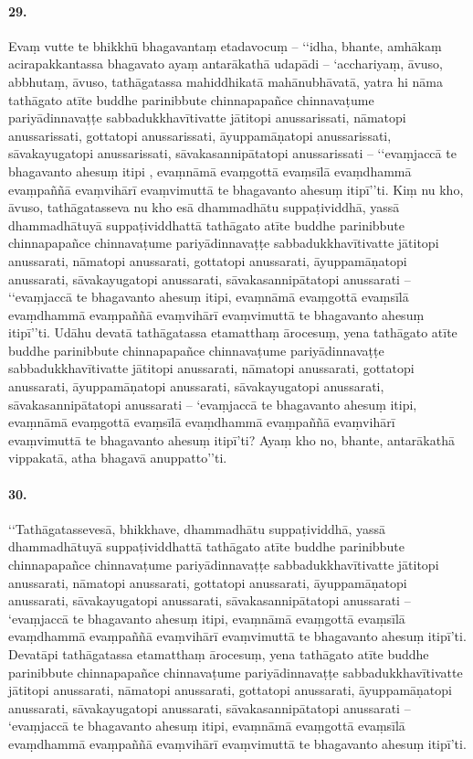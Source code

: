 \paragraph{29.} Evaṃ vutte te bhikkhū bhagavantaṃ etadavocuṃ – ‘‘idha, bhante, amhākaṃ acirapakkantassa bhagavato ayaṃ antarākathā udapādi – ‘acchariyaṃ, āvuso, abbhutaṃ, āvuso, tathāgatassa mahiddhikatā mahānubhāvatā, yatra hi nāma tathāgato atīte buddhe parinibbute chinnapapañce chinnavaṭume pariyādinnavaṭṭe sabbadukkhavītivatte jātitopi anussarissati, nāmatopi anussarissati, gottatopi anussarissati, āyuppamāṇatopi anussarissati, sāvakayugatopi anussarissati, sāvakasannipātatopi anussarissati – ‘‘evaṃjaccā te bhagavanto ahesuṃ itipi , evaṃnāmā evaṃgottā evaṃsīlā evaṃdhammā evaṃpaññā evaṃvihārī evaṃvimuttā te bhagavanto ahesuṃ itipī’’ti. Kiṃ nu kho, āvuso, tathāgatasseva nu kho esā dhammadhātu suppaṭividdhā, yassā dhammadhātuyā suppaṭividdhattā tathāgato atīte buddhe parinibbute chinnapapañce chinnavaṭume pariyādinnavaṭṭe sabbadukkhavītivatte jātitopi anussarati, nāmatopi anussarati, gottatopi anussarati, āyuppamāṇatopi anussarati, sāvakayugatopi anussarati, sāvakasannipātatopi anussarati – ‘‘evaṃjaccā te bhagavanto ahesuṃ itipi, evaṃnāmā evaṃgottā evaṃsīlā evaṃdhammā evaṃpaññā evaṃvihārī evaṃvimuttā te bhagavanto ahesuṃ itipī’’ti. Udāhu devatā tathāgatassa etamatthaṃ ārocesuṃ, yena tathāgato atīte buddhe parinibbute chinnapapañce chinnavaṭume pariyādinnavaṭṭe sabbadukkhavītivatte jātitopi anussarati, nāmatopi anussarati, gottatopi anussarati, āyuppamāṇatopi anussarati, sāvakayugatopi anussarati, sāvakasannipātatopi anussarati – ‘evaṃjaccā te bhagavanto ahesuṃ itipi, evaṃnāmā evaṃgottā evaṃsīlā evaṃdhammā evaṃpaññā evaṃvihārī evaṃvimuttā te bhagavanto ahesuṃ itipī’ti? Ayaṃ kho no, bhante, antarākathā vippakatā, atha bhagavā anuppatto’’ti.

\paragraph{30.} ‘‘Tathāgatassevesā, bhikkhave, dhammadhātu suppaṭividdhā, yassā dhammadhātuyā suppaṭividdhattā tathāgato atīte buddhe parinibbute chinnapapañce chinnavaṭume pariyādinnavaṭṭe sabbadukkhavītivatte jātitopi anussarati, nāmatopi anussarati, gottatopi anussarati, āyuppamāṇatopi anussarati, sāvakayugatopi anussarati, sāvakasannipātatopi anussarati – ‘evaṃjaccā te bhagavanto ahesuṃ itipi, evaṃnāmā evaṃgottā evaṃsīlā evaṃdhammā evaṃpaññā evaṃvihārī evaṃvimuttā te bhagavanto ahesuṃ itipī’ti. Devatāpi tathāgatassa etamatthaṃ ārocesuṃ, yena tathāgato atīte buddhe parinibbute chinnapapañce chinnavaṭume pariyādinnavaṭṭe sabbadukkhavītivatte jātitopi anussarati, nāmatopi anussarati, gottatopi anussarati, āyuppamāṇatopi anussarati, sāvakayugatopi anussarati, sāvakasannipātatopi anussarati – ‘evaṃjaccā te bhagavanto ahesuṃ itipi, evaṃnāmā evaṃgottā evaṃsīlā evaṃdhammā evaṃpaññā evaṃvihārī evaṃvimuttā te bhagavanto ahesuṃ itipī’ti.


